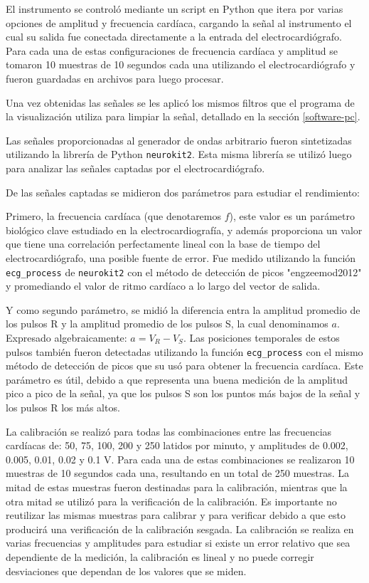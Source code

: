\documentclass[conference]{IEEEtran}
\begin{document}
El instrumento se controló mediante un script en Python que itera por varias
opciones de amplitud y frecuencia cardíaca, cargando la señal al instrumento el
cual su salida fue conectada directamente a la entrada del electrocardiógrafo.
Para cada una de estas configuraciones de frecuencia cardíaca y amplitud se
tomaron 10 muestras de 10 segundos cada una utilizando el electrocardiógrafo y
fueron guardadas en archivos para luego procesar.

Una vez obtenidas las señales se les aplicó los mismos filtros que el programa
de la visualización utiliza para limpiar la señal, detallado en la sección
\ref{software-pc}.

Las señales proporcionadas al generador de ondas arbitrario fueron sintetizadas 
utilizando la librería de Python \texttt{neurokit2}. \cite{neurokit2} Esta misma
librería se utilizó luego para analizar las señales captadas por el
electrocardiógrafo.

De las señales captadas se midieron dos parámetros para estudiar el rendimiento:

Primero, la frecuencia cardíaca (que denotaremos $f$), este valor es un
parámetro biológico clave estudiado en la electrocardiografía, y además
proporciona un valor que tiene una correlación perfectamente lineal con la base
de tiempo del electrocardiógrafo, una posible fuente de error. Fue medido
utilizando la función \texttt{ecg\_process} de \texttt{neurokit2} con  el método
de detección de picos "engzeemod2012" y promediando el valor de ritmo
cardíaco a lo largo del vector de salida.

Y como segundo parámetro, se midió la diferencia entra la amplitud promedio de
los pulsos R y la amplitud promedio de los pulsos S, la cual denominamos $a$.
Expresado algebraicamente: $a = V_R - V_S$.
Las posiciones temporales de estos pulsos también fueron detectadas
utilizando la función \texttt{ecg\_process} con el mismo método de detección de
picos que su usó para obtener la frecuencia cardíaca. Este parámetro es útil,
debido a que representa una buena medición de la amplitud pico a pico de la
señal, ya que los pulsos S son los puntos más bajos de la señal y los pulsos R
los más altos.

La calibración se realizó para todas las combinaciones entre las frecuencias
cardíacas de: 50, 75, 100, 200 y 250 latidos por minuto, y amplitudes de 0.002,
0.005, 0.01, 0.02 y 0.1 V. 
Para cada una de estas combinaciones se realizaron 10 muestras de 10 segundos
cada una, resultando en un total de 250 muestras. La mitad de estas muestras
fueron destinadas para la calibración, mientras que la otra mitad se utilizó
para la verificación de la calibración. Es importante no reutilizar las mismas
muestras para calibrar y para verificar debido a que esto producirá una
verificación de la calibración sesgada. La calibración se realiza en varias
frecuencias y amplitudes para estudiar si existe un error relativo que sea
dependiente de la medición, la calibración es lineal y no puede corregir
desviaciones que dependan de los valores que se miden.
\end{document}
